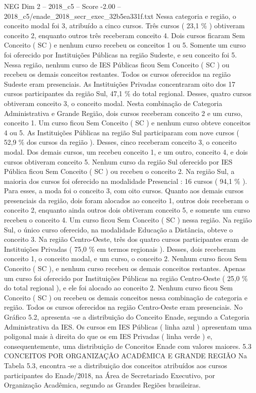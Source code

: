 \begin{textsample}{NEG Dim 2 – 2018\_c5 – Score -2.00 – 2018\_c5/enade\_2018\_secr\_exec\_32b5ea331f.txt}
Nessa categoria e região, o conceito modal foi 3, atribuído a cinco cursos.
Três cursos ( 23,1 \% ) obtiveram conceito 2, enquanto outros três receberam conceito 4.
Dois cursos ficaram Sem Conceito ( SC ) e nenhum curso recebeu os conceitos 1 ou 5.
Somente um curso foi oferecido por Instituições Públicas na região Sudeste, e seu conceito foi 5.
Nessa região, nenhum curso de IES Públicas ficou Sem Conceito ( SC ) ou recebeu os demais conceitos restantes.
Todos os cursos oferecidos na região Sudeste eram presenciais.
As Instituições Privadas concentraram oito dos 17 cursos participantes da região Sul, 47,1 \% do total regional.
Desses, quatro cursos obtiveram conceito 3, o conceito modal.
Nesta combinação de Categoria Administrativa e Grande Região, dois cursos receberam conceito 2 e um curso, conceito 1.
Um curso ficou Sem Conceito ( SC ) e nenhum curso obteve conceitos 4 ou 5.
As Instituições Públicas na região Sul participaram com nove cursos ( 52,9 \% dos cursos da região ).
Desses, cinco receberam conceito 3, o conceito modal.
Dos demais cursos, um recebeu conceito 1, e um outro, conceito 4, e dois cursos obtiveram conceito 5.
Nenhum curso da região Sul oferecido por IES Pública ficou Sem Conceito ( SC ) ou recebeu o conceito 2.
Na região Sul, a maioria dos cursos foi oferecido na modalidade Presencial : 16 cursos ( 94,1 \% ).
Para esses, a moda foi o conceito 3, com oito cursos.
Quanto aos demais cursos presenciais da região, dois foram alocados ao conceito 1, outros dois receberam o conceito 2, enquanto ainda outros dois obtiveram conceito 5, e somente um curso recebeu o conceito 4.
Um curso ficou Sem Conceito ( SC ) nessa região.
Na região Sul, o único curso oferecido, na modalidade Educação a Distância, obteve o conceito 3.
Na região Centro-Oeste, três dos quatro cursos participantes eram de Instituições Privadas ( 75,0 \% em termos regionais ).
Desses, dois receberam conceito 1, o conceito modal, e um curso, o conceito 2.
Nenhum curso ficou Sem Conceito ( SC ), e nenhum curso recebeu os demais conceitos restantes.
Apenas um curso foi oferecido por Instituições Públicas na região Centro-Oeste ( 25,0 \% do total regional ), e ele foi alocado ao conceito 2.
Nenhum curso ficou Sem Conceito ( SC ) ou recebeu os demais conceitos nessa combinação de categoria e região.
Todos os cursos oferecidos na região Centro-Oeste eram presenciais.
No Gráfico 5.2, apresenta -se a distribuição do Conceito Enade, segundo a Categoria Administrativa da IES.
Os cursos em IES Públicas ( linha azul ) apresentam uma poligonal mais à direita do que os em IES Privadas ( linha verde ) e, consequentemente, uma distribuição de Conceitos Enade com valores maiores. 5.3 CONCEITOS POR ORGANIZAÇÃO ACADÊMICA E GRANDE REGIÃO Na Tabela 5.3, encontra -se a distribuição dos conceitos atribuídos aos cursos participantes do Enade/2018, na Área de Secretariado Executivo, por Organização Acadêmica, segundo as Grandes Regiões brasileiras.

\end{textsample}
